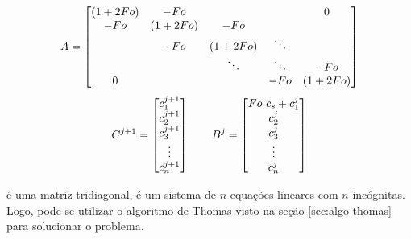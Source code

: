 \begin{equation*}
	\cmrtext{A} =
	\begin{bmatrix}
		(1+2Fo) & -Fo &         &        & 0\\
		-Fo & (1+2Fo) &  -Fo   &        & \\
		    & -Fo &   (1+2Fo)   & \ddots & \\
		    &     &  \ddots & \ddots & -Fo \\
	     0  &     &         &  -Fo   & (1+2Fo) 
	\end{bmatrix}
\end{equation*}
\begin{equation*}
	\cmrtext{C^{j+1}} =
	\begin{bmatrix}
		c_1^{j+1} \\
		c_2^{j+1} \\
		c_3^{j+1} \\
		\vdots \\
		c_n^{j+1}
	\end{bmatrix}
	\qquad
	\cmrtext{B^j} =	
	\begin{bmatrix}
		Fo\ c_s+c_1^j \\
		c_2^{j} \\
		c_3^{j} \\
		\vdots \\
		c_n^{j}
	\end{bmatrix}
\end{equation*}

 é uma matriz tridiagonal,  é um sistema de $n$ equações lineares com $n$ incógnitas. Logo, pode-se utilizar o algoritmo de Thomas visto na seção \ref{sec:algo-thomas} para solucionar o problema.
